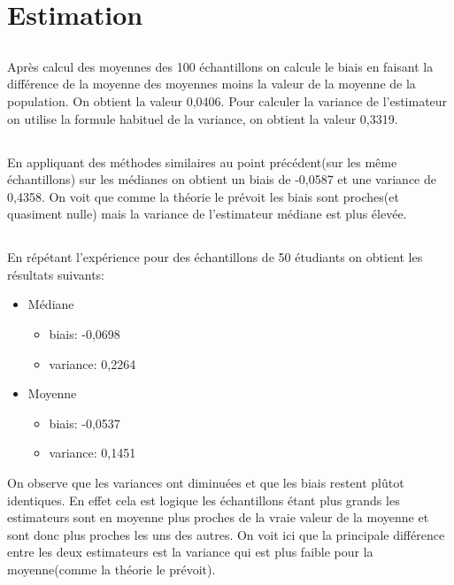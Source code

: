 \documentclass[a4paper, 11pt]{article}
\begin{document}
   \section{Estimation}
   \subsection{}
   Après calcul des moyennes des 100 échantillons on calcule le biais en faisant la différence de la moyenne des moyennes moins la valeur de la moyenne de la population. On obtient la valeur 0,0406. Pour calculer la variance de l'estimateur on utilise la formule habituel de la variance, on obtient la valeur 0,3319. 
   \subsection{}
   En appliquant des méthodes similaires au point précédent(sur les même échantillons) sur les médianes on obtient un biais de -0,0587 et une variance de 0,4358. On voit que comme la théorie le prévoit les biais sont proches(et quasiment nulle) mais la variance de l'estimateur médiane est plus élevée.
   \subsection{}
En répétant l'expérience pour des échantillons de 50 étudiants on obtient les résultats suivants:\begin{itemize}
\item Médiane \begin{itemize}
	\item biais: -0,0698 
	\item variance: 0,2264 
\end{itemize}
\item Moyenne \begin{itemize}
	\item biais: -0,0537
	\item variance: 0,1451
\end{itemize}
\end{itemize}
On observe que les variances ont diminuées et que les biais restent plûtot identiques. En effet cela est logique les échantillons étant plus grands les estimateurs sont en moyenne plus proches de la vraie valeur de la moyenne et sont donc plus proches les uns des autres. On voit ici que la principale différence entre les deux estimateurs est la variance qui est plus faible pour la moyenne(comme la théorie le prévoit).
\end{document}
